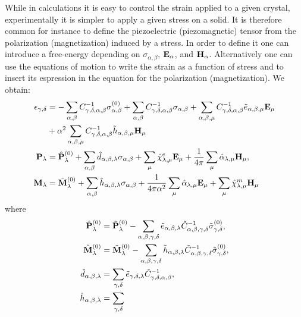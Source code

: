 \documentclass[12pt,a4paper,twoside]{report}
\begin{document}
\newpage
{\color{web-blue}
While in calculations it is easy to control the strain applied to
a given crystal, experimentally it is simpler to apply a given stress
on a solid. It is therefore common for instance to define the 
piezoelectric (piezomagnetic) tensor from the polarization 
(magnetization) induced by a stress. In order to define it one 
can introduce a free-energy depending on $\sigma_{\alpha,\beta}$,
${\bf E}_\alpha$, and ${\bf H}_\alpha$. Alternatively one can use the
equations of motion to write the strain as a function of stress and
to insert its espression in the equation for the polarization
(magnetization). We obtain:
\begin{align}
\epsilon_{\gamma,\delta} &=
- \sum_{\alpha,\beta} 
C^{-1}_{\gamma,\delta,\alpha,\beta} \sigma^{(0)}_{\alpha,\beta} 
+ \sum_{\alpha,\beta} 
C^{-1}_{\gamma,\delta,\alpha,\beta} \sigma_{\alpha,\beta} 
+ \sum_{\alpha,\beta,\mu} 
C^{-1}_{\gamma,\delta,\alpha,\beta} \tilde e_{\alpha,\beta,\mu} {\bf E}_\mu 
\nonumber \\
&+ \alpha^2 \sum_{\alpha,\beta,\mu} 
C^{-1}_{\gamma,\delta,\alpha,\beta} \tilde h_{\alpha,\beta,\mu} {\bf H}_\mu 
\\
{\bf P}_{\lambda}&= \hat {\bf P}^{(0)}_{\lambda}
+\sum_{\alpha,\beta} \hat d_{\alpha,\beta,\lambda} 
\sigma_{\alpha,\beta} +
\sum_{\mu} 
\hat \chi^e_{\lambda,\mu}
{\bf E}_{\mu} +
{1\over 4 \pi} \sum_{\mu} \hat \alpha_{\lambda,\mu} 
{\bf H}_{\mu}, \\
{\bf M}_{\lambda}&= \hat {\bf M}^{(0)}_{\lambda}
+\sum_{\alpha,\beta} \hat h_{\alpha,\beta,\lambda} 
\sigma_{\alpha,\beta} +
{1\over 4 \pi \alpha^2} \sum_{\mu} \hat \alpha_{\lambda,\mu} 
{\bf E}_{\mu}+
\sum_{\mu} 
\hat \chi^m_{\lambda,\mu}
{\bf H}_{\mu}
\end{align} 
where
\begin{align}
\hat {\bf P}^{(0)}_{\lambda}&= \tilde {\bf P}^{(0)}_{\lambda}
-\sum_{\alpha,\beta,\gamma,\delta} \tilde e_{\alpha,\beta,\lambda}
\tilde C^{-1}_{\alpha,\beta,\gamma,\delta} 
\tilde \sigma^{(0)}_{\gamma,\delta}, \\
\hat {\bf M}^{(0)}_{\lambda}&= \tilde {\bf M}^{(0)}_{\lambda}
-\sum_{\alpha,\beta,\gamma,\delta} \tilde h_{\alpha,\beta,\lambda}
\tilde C^{-1}_{\alpha,\beta,\gamma,\delta} 
\tilde \sigma^{(0)}_{\gamma,\delta}, \\
\hat d_{\alpha,\beta,\lambda}&= \sum_{\gamma,\delta} 
\tilde e_{\gamma,\delta,\lambda} 
\tilde C^{-1}_{\gamma,\delta,\alpha,\beta}, \\
\hat h_{\alpha,\beta,\lambda}&= \sum_{\gamma,\delta} 

\end{align}}
\end{document}
